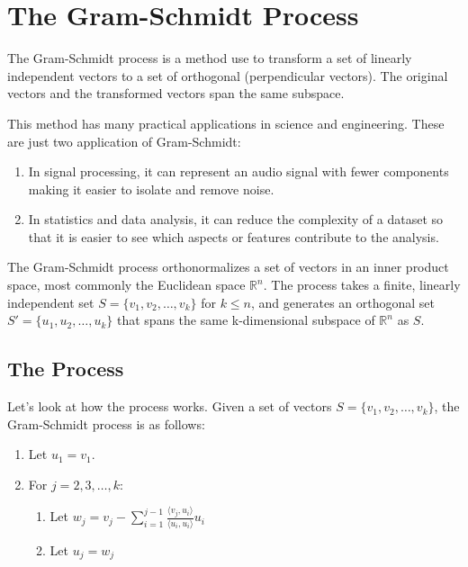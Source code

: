 \chapter{The Gram-Schmidt Process}

The Gram-Schmidt process is a method use to transform a set of linearly independent vectors to a set of orthogonal (perpendicular vectors). The original vectors and the transformed vectors span the same subspace. 

This method has many practical applications in science and engineering. These are just two application of Gram-Schmidt:
\begin{enumerate}
\item In signal processing, it can represent an audio signal with fewer components making it easier to isolate and remove noise. 
\item In statistics and data analysis, it can reduce the complexity of a dataset so that it is easier to see which aspects or features contribute to the analysis. 
\end{enumerate}

The Gram-Schmidt process orthonormalizes a set of
vectors in an inner product space, most commonly the Euclidean space
$\mathbb{R}^n$. The process takes a finite, linearly independent set
$S = \{v_1, v_2, \ldots, v_k\}$ for $k \leq n$, and generates an
orthogonal set $S' = \{u_1, u_2, \ldots, u_k\}$ that spans the same
k-dimensional subspace of $\mathbb{R}^n$ as $S$.

\section{The Process}

Let's look at how the process works. Given a set of vectors $S = \{v_1, v_2, \ldots, v_k\}$, the Gram-Schmidt process is as follows:

\begin{enumerate}
    \item Let $u_1 = v_1$.
    \item For $j = 2, 3, \ldots, k$:
    \begin{enumerate}
        \item Let $w_j = v_j - \sum_{i=1}^{j-1} \frac{\langle v_j, u_i \rangle}{\langle u_i, u_i \rangle} u_i$
        \item Let $u_j = w_j$
    \end{enumerate}
\end{enumerate}

